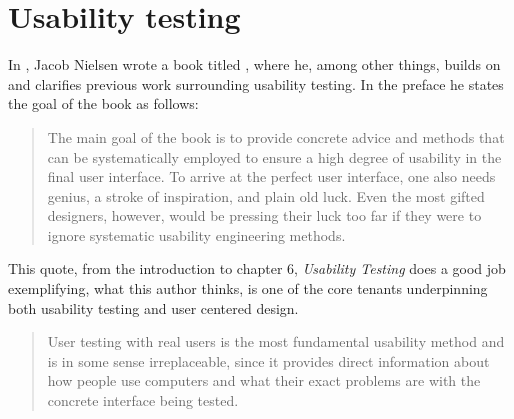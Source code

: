 




\section{Usability testing}

%

  In \citeyear{citeHeuristicsNielsenUsabilityEngineering}, Jacob Nielsen wrote a
  book titled %
  \cite{citeHeuristicsNielsenUsabilityEngineering}, where he, among other
  things, builds on and clarifies previous work surrounding usability testing.
  In the preface he states the goal of the book as follows:

  \begin{quote}
    The main goal of the book is to provide concrete advice and
    methods that can be systematically employed to ensure a high
    degree of usability in the final user interface. To arrive at the perfect
    user interface, one also needs genius, a stroke of inspiration, and
    plain old luck. Even the most gifted designers, however, would be
    pressing their luck too far if they were to ignore systematic usability
    engineering methods.
  \end{quote}

  This quote, from the introduction to chapter 6,
  \textit{Usability Testing}%
  \cite[p. 165]{citeHeuristicsNielsenUsabilityEngineering}
  does a good job exemplifying, what this author thinks, is one of the
  core tenants underpinning both usability testing and user centered
  design.

  \begin{quote}
    User testing with real users is the most fundamental usability method and
    is in some sense irreplaceable, since it provides direct information about
    how people use computers and what their exact problems are with the
    concrete interface being tested.
  \end{quote}

